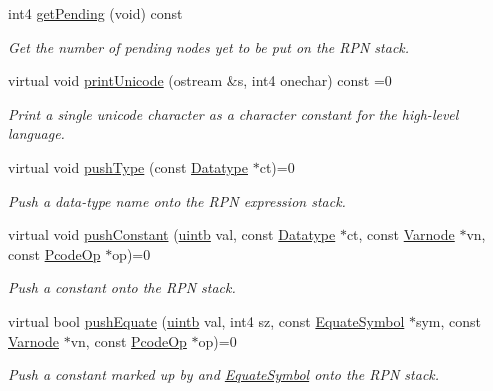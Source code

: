 \begin{DoxyCompactItemize}
int4 \mbox{\hyperlink{class_print_language_a6d711c4dfac0fbe001fa43bb1f0f71e2}{get\+Pending}} (void) const
\begin{DoxyCompactList}\small\item\em Get the number of pending nodes yet to be put on the R\+PN stack. \end{DoxyCompactList}\item 
virtual void \mbox{\hyperlink{class_print_language_acfc5f922cf2befcad9b38ef1d55c35e3}{print\+Unicode}} (ostream \&s, int4 onechar) const =0
\begin{DoxyCompactList}\small\item\em Print a single unicode character as a {\itshape character} {\itshape constant} for the high-\/level language. \end{DoxyCompactList}\item 
virtual void \mbox{\hyperlink{class_print_language_a4bd65e5a27a60ab1b5590673c6396a4f}{push\+Type}} (const \mbox{\hyperlink{class_datatype}{Datatype}} $\ast$ct)=0
\begin{DoxyCompactList}\small\item\em Push a data-\/type name onto the R\+PN expression stack. \end{DoxyCompactList}\item 
virtual void \mbox{\hyperlink{class_print_language_a1ef3fe4265a8f0abdb72f90ce3cb9944}{push\+Constant}} (\mbox{\hyperlink{types_8h_a2db313c5d32a12b01d26ac9b3bca178f}{uintb}} val, const \mbox{\hyperlink{class_datatype}{Datatype}} $\ast$ct, const \mbox{\hyperlink{class_varnode}{Varnode}} $\ast$vn, const \mbox{\hyperlink{class_pcode_op}{Pcode\+Op}} $\ast$op)=0
\begin{DoxyCompactList}\small\item\em Push a constant onto the R\+PN stack. \end{DoxyCompactList}\item 
virtual bool \mbox{\hyperlink{class_print_language_ad90b2dc069614a6ad24ca8d73345ab74}{push\+Equate}} (\mbox{\hyperlink{types_8h_a2db313c5d32a12b01d26ac9b3bca178f}{uintb}} val, int4 sz, const \mbox{\hyperlink{class_equate_symbol}{Equate\+Symbol}} $\ast$sym, const \mbox{\hyperlink{class_varnode}{Varnode}} $\ast$vn, const \mbox{\hyperlink{class_pcode_op}{Pcode\+Op}} $\ast$op)=0
\begin{DoxyCompactList}\small\item\em Push a constant marked up by and \mbox{\hyperlink{class_equate_symbol}{Equate\+Symbol}} onto the R\+PN stack. \end{DoxyCompactList}\item 

\end{DoxyCompactItemize}
